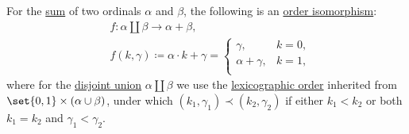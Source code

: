 \begin{proposition}\label{thm:ordinal_addition_disjoin_union}
  For the \hyperref[def:ordinal_arithmetic/addition]{sum} of two ordinals \( \alpha \) and \( \beta \), the following is an \hyperref[def:preordered_set/homomorphism]{order isomorphism}:
  \begin{equation*}
    \begin{aligned}
      &f: \alpha \amalg \beta \to \alpha + \beta, \\
      &f(k, \gamma) \coloneqq \alpha \cdot k + \gamma = \begin{cases}
        \gamma,          &k = 0, \\
        \alpha + \gamma, &k = 1, \\
      \end{cases}
    \end{aligned}
  \end{equation*}
  where for the \hyperref[def:disjoint_union]{disjoint union} \( \alpha \amalg \beta \) we use the \hyperref[def:lexicographic_order]{lexicographic order} inherited from \( \set{ 0, 1 } \times (\alpha \cup \beta) \), under which \( (k_1, \gamma_1) \prec (k_2, \gamma_2) \) if either \( k_1 < k_2 \) or both \( k_1 = k_2 \) and \( \gamma_1 < \gamma_2 \).
\end{proposition}
